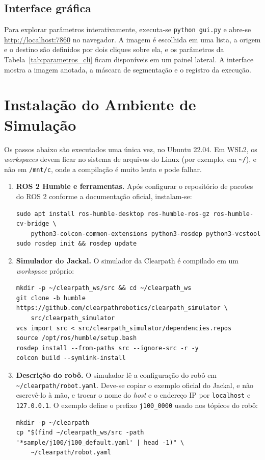 \documentclass[
    12pt,
    openright,
    oneside,
    a4paper,
    english,
    brazil
]{abntex2}
\begin{document}
\begin{apendicesenv}
\subsection{Interface gráfica}

Para explorar parâmetros interativamente, executa-se \texttt{python gui.py} e abre-se \url{http://localhost:7860} no navegador. A imagem é escolhida em uma lista, a origem e o destino são definidos por dois cliques sobre ela, e os parâmetros da Tabela~\ref{tab:parametros_cli} ficam disponíveis em um painel lateral. A interface mostra a imagem anotada, a máscara de segmentação e o registro da execução.

\section{Instalação do Ambiente de Simulação}
\label{sec:ap_simulacao}

Os passos abaixo são executados uma única vez, no Ubuntu 22.04. Em WSL2, os \textit{workspaces} devem ficar no sistema de arquivos do Linux (por exemplo, em \texttt{\textasciitilde/}), e não em \texttt{/mnt/c}, onde a compilação é muito lenta e pode falhar.

\begin{enumerate}
    \item \textbf{ROS 2 Humble e ferramentas.} Após configurar o repositório de pacotes do ROS 2 conforme a documentação oficial, instalam-se:
\begin{lstlisting}[style=comandos]
sudo apt install ros-humble-desktop ros-humble-ros-gz ros-humble-cv-bridge \
    python3-colcon-common-extensions python3-rosdep python3-vcstool
sudo rosdep init && rosdep update
\end{lstlisting}

    \item \textbf{Simulador do Jackal.} O simulador da Clearpath é compilado em um \textit{workspace} próprio:
\begin{lstlisting}[style=comandos]
mkdir -p ~/clearpath_ws/src && cd ~/clearpath_ws
git clone -b humble https://github.com/clearpathrobotics/clearpath_simulator \
    src/clearpath_simulator
vcs import src < src/clearpath_simulator/dependencies.repos
source /opt/ros/humble/setup.bash
rosdep install --from-paths src --ignore-src -r -y
colcon build --symlink-install
\end{lstlisting}

    \item \textbf{Descrição do robô.} O simulador lê a configuração do robô em \texttt{\textasciitilde/\allowbreak{}clearpath/\allowbreak{}robot.yaml}. Deve-se copiar o exemplo oficial do Jackal, e não escrevê-lo à mão, e trocar o nome do \textit{host} e o endereço IP por \texttt{localhost} e \texttt{127.0.0.1}. O exemplo define o prefixo \texttt{j100\_0000} usado nos tópicos do robô:
\begin{lstlisting}[style=comandos]
mkdir -p ~/clearpath
cp "$(find ~/clearpath_ws/src -path '*sample/j100/j100_default.yaml' | head -1)" \
    ~/clearpath/robot.yaml
\end{lstlisting}


\end{enumerate}
\end{apendicesenv}
\end{document}
